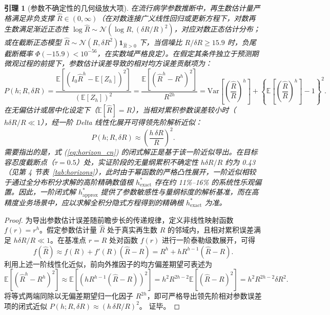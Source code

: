 \documentclass[11pt,a4paper]{article}
\theoremstyle{plain}
\newtheorem{lemma}{引理}
\theoremstyle{definition}
\begin{document}
\begin{lemma}[参数不确定性的几何级放大项]\label{lem:param_amplification}
在流行病学参数推断中，再生数估计量严格满足非负支撑 $\hat{R} \in (0, \infty)$（在对数连接广义线性回归或更新方程下，对数再生数满足渐近正态性 $\log \hat{R} \sim \mathcal{N}(\log R, (\delta R / R)^2)$，对应对数正态估计分布；或在截断正态模型 $\hat{R} \sim \mathcal{N}(R, \delta R^2)\mathbf{1}_{\hat{R}>0}$ 下，当信噪比 $R/\delta R \ge 15.9$ 时，负尾截断概率 $\Phi(-15.9) < 10^{-56}$，在实数域严格良定）。在假定其条件独立于预测期微观过程的前提下，参数估计误差导致的相对均方误差贡献项为：
\begin{equation}
P(h; R, \delta R) = \frac{\mathbb{E}[(I_0 \hat{R}^h - \mathbb{E}[Z_h])^2]}{(\mathbb{E}[Z_h])^2} = \frac{\mathbb{E}[(\hat{R}^h - R^h)^2]}{R^{2h}} = \text{Var}\left[\left(\frac{\hat{R}}{R}\right)^h\right] + \left\{\mathbb{E}\left[\left(\frac{\hat{R}}{R}\right)^h\right] - 1\right\}^2.
\end{equation}
在无偏估计或居中化设定下（$\mathbb{E}[\hat{R}] = R$），当相对累积参数误差较小时（$h \delta R / R \ll 1$），经一阶 Delta 线性化展开可得领先阶解析近似：
\begin{equation}
P(h; R, \delta R) \approx \left(\frac{h\,\delta R}{R}\right)^2.\label{eq:param_amplification}
\end{equation}
需要指出的是，式 (\ref{eq:horizon_cn}) 的闭式解正是基于该一阶近似导出。在目标容忍度截断点（$\tau=0.5$）处，实证阶段的无量纲累积不确定性 $h \delta R / R$ 约为 0.43（见第 4 节表~\ref{tab:horizons}），此时由于幂函数的严格凸性展开，一阶近似相较于通过全分布积分求解的高阶精确数值根 $h^*_{\text{exact}}$ 存在约 11\%--16\% 的系统性乐观偏置。因此，一阶闭式解 $h^*_{\text{approx}}$ 提供了参数敏感性与量纲标度的解析基准，而在高精度业务场景中，应以求解全积分隐式方程得到的精确根 $h^*_{\text{exact}}$ 为准。
\end{lemma}

\begin{proof}
为导出参数估计误差随前瞻步长的传递规律，定义非线性映射函数 $f(r) = r^h$。假定参数估计量 $\hat{R}$ 处于真实再生数 $R$ 的邻域内，且相对累积误差满足 $h \delta R / R \ll 1$。在基准点 $r = R$ 处对函数 $f(r)$ 进行一阶泰勒级数展开，可得
\begin{equation}
f(\hat{R}) \approx f(R) + f'(R)(\hat{R}-R) = R^h + h R^{h-1}(\hat{R}-R).
\end{equation}
利用上述一阶线性化近似，前向外推因子的均方偏差期望可表述为
\begin{equation}
\mathbb{E}[(\hat{R}^h - R^h)^2] \approx \mathbb{E}\left[\left(h R^{h-1}(\hat{R}-R)\right)^2\right] = h^2 R^{2h-2} \mathbb{E}[(\hat{R}-R)^2] = h^2 R^{2h-2} \delta R^2.
\end{equation}
将等式两端同除以无偏差期望归一化因子 $R^{2h}$，即可严格导出领先阶相对参数误差项的闭式近似 $P(h; R, \delta R) \approx (h\,\delta R/R)^2$。
证毕。
\end{proof}
\end{document}
